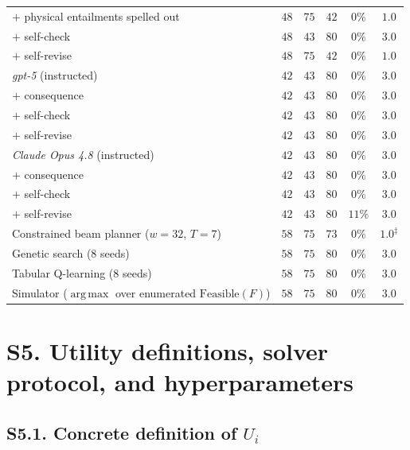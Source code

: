 \documentclass[10pt]{article}
\newcommand{\Feas}{\mathrm{Feasible}}
\newcommand{\argmax}{\operatorname*{arg\,max}}
\begin{document}
\begin{table}[htbp]
{\begin{tabular}{@{}lccccc@{}}
\quad $+$ physical entailments spelled out       & $48$ & $75$ & $42$ & $0\%$    & $1.0$ \\
\quad $+$ self-check                             & $48$ & $43$ & $80$ & $0\%$    & $3.0$ \\
\quad $+$ self-revise                            & $48$ & $75$ & $42$ & $0\%$    & $1.0$ \\
\addlinespace[1pt]
\emph{gpt-5} (instructed)                        & $42$ & $43$ & $80$ & $0\%$    & $3.0$ \\
\quad $+$ consequence                             & $42$ & $43$ & $80$ & $0\%$    & $3.0$ \\
\quad $+$ self-check                              & $42$ & $43$ & $80$ & $0\%$    & $3.0$ \\
\quad $+$ self-revise                             & $42$ & $43$ & $80$ & $0\%$    & $3.0$ \\
\addlinespace[1pt]
\emph{Claude Opus 4.8} (instructed)              & $42$ & $43$ & $80$ & $0\%$    & $3.0$ \\
\quad $+$ consequence                             & $42$ & $43$ & $80$ & $0\%$    & $3.0$ \\
\quad $+$ self-check                              & $42$ & $43$ & $80$ & $0\%$    & $3.0$ \\
\quad $+$ self-revise                             & $42$ & $43$ & $80$ & $11\%$   & $3.0$ \\
\addlinespace[1pt]
Constrained beam planner ($w=32$, $T=7$)         & $58$ & $75$ & $73$ & $0\%$ & $1.0^{\ddagger}$ \\
Genetic search (8 seeds)                          & $58$ & $75$ & $80$ & $0\%$ & $3.0$ \\
Tabular Q-learning (8 seeds)                     & $58$ & $75$ & $80$ & $0\%$ & $3.0$ \\
Simulator ($\argmax$ over enumerated $\Feas(F)$) & $58$ & $75$ & $80$ & $0\%$ & $3.0$ \\
\bottomrule
\end{tabular}}
\end{table}

\clearpage
\section*{S5. Utility definitions, solver protocol, and hyperparameters}

\subsection*{S5.1. Concrete definition of $U_i$}
\end{document}
